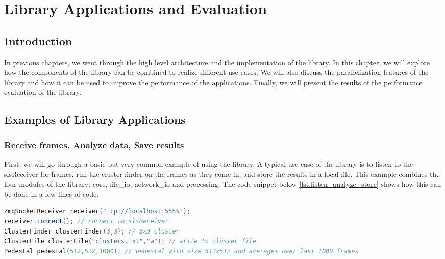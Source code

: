 
\setcounter{chapter}{3}
\chapter{Library Applications and Evaluation}
\minitoc %
\graphicspath{{Chapitre4/figures/}}

\pagestyle{fancy}
\fancyhf{}
\fancyhead[R]{\bfseries\rightmark}
\fancyfoot[R]{\thepage}
\renewcommand{\headrulewidth}{0.5pt}
\renewcommand{\footrulewidth}{0pt}
\renewcommand{\chaptermark}[1]{\markboth{{\chaptername~\thechapter. #1 }}{}}
\renewcommand{\sectionmark}[1]{\markright{\thechapter.\thesection~ #1}}

\begin{spacing}{1.2}

    \section*{Introduction}
    In previous chapters, we went through the high level architecture and the implementation of the library. In this chapter,
    we will explore how the components of the library can be combined to realize different use cases. We will also discuss
    the parallelization features of the library and how it can be used to improve the performance of the applications.
    Finally, we will present the results of the performance evaluation of the library.

    \section{Examples of Library Applications}
    \subsection{Receive frames, Analyze data, Save results}
    First, we will go through a basic but very common example of using the library. A typical use case
    of the library is to listen to the slsReceiver for frames, run the cluster finder on the frames as they come in,
    and store the results in a local file.
    This example combines the four modules of the library: core, file\_io, network\_io and processing.
    The code snippet below \ref{lst:listen_analyze_store} shows how this can be done in a few lines of code.

    \begin{lstlisting}[language=C++, caption=Example of a common use case ,label=lst:listen_analyze_store]
ZmqSocketReceiver receiver("tcp://localhost:5555");
receiver.connect(); // connect to slsReceiver
ClusterFinder clusterFinder(3,3); // 3x3 cluster
ClusterFile clusterFile("clusters.txt","w"); // write to cluster file
Pedestal pedestal(512,512,1000); // pedestal with size 512x512 and averages over last 1000 frames


\end{lstlisting}
\end{spacing}
